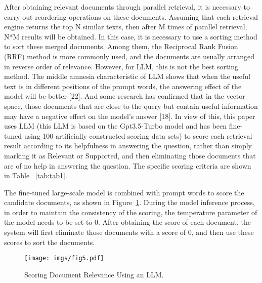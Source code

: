 After obtaining relevant documents through parallel retrieval, it is necessary to carry out reordering operations on these documents. Assuming that each retrieval engine returns the top N similar texts, then after M times of parallel retrieval, N*M results will be obtained. In this case, it is necessary to use a sorting method to sort these merged documents. Among them, the Reciprocal Rank Fusion (RRF) method is more commonly used, and the documents are usually arranged in reverse order of relevance. However, for LLM, this is not the best sorting method. The middle amnesia characteristic of LLM shows that when the useful text is in different positions of the prompt words, the answering effect of the model will be better [22]. And some research has confirmed that in the vector space, those documents that are close to the query but contain useful information may have a negative effect on the model's answer [18]. In view of this, this paper uses LLM (this LLM is based on the Gpt3.5-Turbo model and has been fine-tuned using 100 artificially constructed scoring data sets) to score each retrieval result according to its helpfulness in answering the question, rather than simply marking it as Relevant or Supported, and then eliminating those documents that are of no help in answering the question. The specific scoring criteria are shown in Table ~\ref{tab:tab1}.

\setcounter{table}{0}
\begin{table}[h!]\small
 \caption{Scoring Criteria for Constructing the Rating Dataset}
    \centering
     \vspace{-5pt}
\label{tab:tab1}
\end{table}



The fine-tuned large-scale model is combined with prompt words to score the candidate documents, as shown in Figure~\ref{fig:fig5}. During the model inference process, in order to maintain the consistency of the scoring, the temperature parameter of the model needs to be set to 0. After obtaining the score of each document, the system will first eliminate those documents with a score of 0, and then use these scores to sort the documents.
\begin{figure} [h!] \small
    \centering
    \texttt{[image: imgs/fig5.pdf]}
    \caption{Scoring Document Relevance Using an LLM.}
    \label{fig:fig5}
\end{figure}


